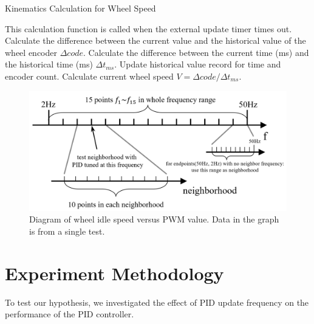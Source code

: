 \documentclass[conference]{IEEEtran}
\begin{document}
\begin{algorithm}
	\caption{Kinematics Calculation for Wheel Speed}\label{KinematicsAlgorithm}
	\begin{algorithmic}[1]
        \State This calculation function is called when the external update timer times out.
        \State Calculate the difference between the current value and the historical value of the wheel encoder $\Delta code$.
        \State Calculate the difference between the current time (ms) and the historical time (ms) $\Delta t_{ms}$.
        \State Update historical value record for time and encoder count.
        \State Calculate current wheel speed $V = \Delta code / \Delta t_{ms}$.
	\end{algorithmic} 
\end{algorithm}

\begin{figure}[htbp]
\centerline{\includegraphics[width = \linewidth]{Report/Pic/WheelResponse_2.png}}
\caption{Diagram of wheel idle speed versus PWM value. Data in the graph is from a single test. } %
\label{fig_WheelCharacter}
\end{figure}



\section{Experiment Methodology}
\label{Experiment Methodology}

To test our hypothesis, we investigated the effect of PID update frequency on the performance of the PID controller.
\end{document}
